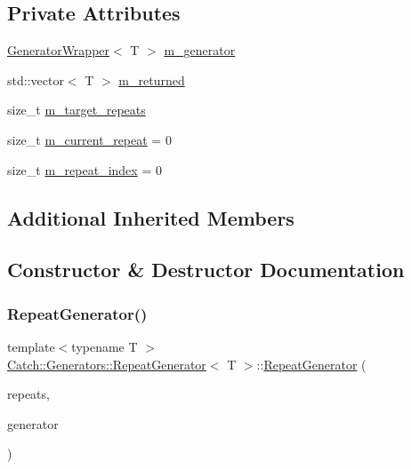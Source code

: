 \subsection*{Private Attributes}
\begin{DoxyCompactItemize}
\item 
\mbox{\hyperlink{class_catch_1_1_generators_1_1_generator_wrapper}{Generator\+Wrapper}}$<$ T $>$ \mbox{\hyperlink{class_catch_1_1_generators_1_1_repeat_generator_ae4eeba772ffba6d928f959835e8db154}{m\+\_\+generator}}
\item 
std\+::vector$<$ T $>$ \mbox{\hyperlink{class_catch_1_1_generators_1_1_repeat_generator_aee4c7a8c54c739f2fea75c01b02ccc6e}{m\+\_\+returned}}
\item 
size\+\_\+t \mbox{\hyperlink{class_catch_1_1_generators_1_1_repeat_generator_af73981a50e1e1438d0159ac0b55a84bf}{m\+\_\+target\+\_\+repeats}}
\item 
size\+\_\+t \mbox{\hyperlink{class_catch_1_1_generators_1_1_repeat_generator_ad834535fe3a2aec44bf53632c43f68cf}{m\+\_\+current\+\_\+repeat}} = 0
\item 
size\+\_\+t \mbox{\hyperlink{class_catch_1_1_generators_1_1_repeat_generator_ab311143cc38451a21de61f444fbc7cf6}{m\+\_\+repeat\+\_\+index}} = 0
\end{DoxyCompactItemize}
\subsection*{Additional Inherited Members}


\subsection{Constructor \& Destructor Documentation}
\mbox{\label{class_catch_1_1_generators_1_1_repeat_generator_a3aee12c4f9c2c04823ca3c75a20f234f}} 
\subsubsection{\texorpdfstring{RepeatGenerator()}{RepeatGenerator()}}
{\footnotesize\ttfamily template$<$typename T $>$ \\
\mbox{\hyperlink{class_catch_1_1_generators_1_1_repeat_generator}{Catch\+::\+Generators\+::\+Repeat\+Generator}}$<$ T $>$\+::\mbox{\hyperlink{class_catch_1_1_generators_1_1_repeat_generator}{Repeat\+Generator}} (\begin{DoxyParamCaption}\item[{size\+\_\+t}]{repeats,  }\item[{\mbox{\hyperlink{class_catch_1_1_generators_1_1_generator_wrapper}{Generator\+Wrapper}}$<$ T $>$ \&\&}]{generator }\end{DoxyParamCaption})\hspace{0.3cm}{\ttfamily [inline]}}



